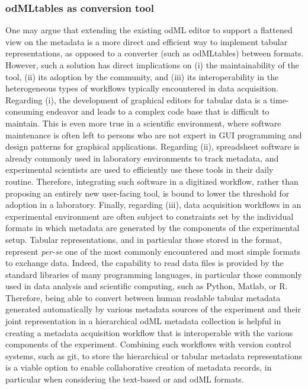 {\subsubsection{odMLtables as conversion tool}
One may argue that extending the existing odML editor to support a flattened view on the metadata is a more direct and efficient way to implement tabular representations, as opposed to a converter (such as odMLtables) between formats. However, such a solution has direct implications on (i) the maintainability of the tool, (ii) its adoption by the community, and (iii) its interoperability in the heterogeneous types of workflows typically encountered in data acquisition. Regarding (i), the development of graphical editors for tabular data  is a time-consuming endeavor and leads to a complex code base that is difficult to maintain. This is even more true in a scientific environment, where software maintenance is often left to persons who are not expert in GUI programming and design patterns for graphical applications. Regarding (ii), spreadsheet software is already commonly used in laboratory environments to track metadata, and experimental scientists are used to efficiently use these tools in their daily routine. Therefore, integrating such software in a digitized workflow, rather than proposing an entirely new user-facing tool, is bound to lower the threshold for adoption in a laboratory. Finally, regarding (iii), data acquisition workflows in an experimental environment are often subject to constraints set by the individual formats in which metadata are generated by the components of the experimental setup. Tabular representations, and in particular those stored in the  format, represent \textit{per-se} one of the most commonly encountered and most simple formats to exchange data. Indeed, the capability to read  data files is provided by the standard libraries of many programming languages, in particular those commonly used in data analysis and scientific computing, such as Python, Matlab, or R. Therefore, being able to convert between human readable tabular metadata generated automatically by various metadata sources of the experiment and their joint representation in a hierarchical odML metadata collection is helpful in creating a metadata acquisition workflow that is interoperable with the various components of the experiment. Combining such workflows with version control systems, such as git, to store the hierarchical or tabular metadata representations is a viable option to enable collaborative creation of metadata records, in particular when considering the text-based  or and odML formats.

}
